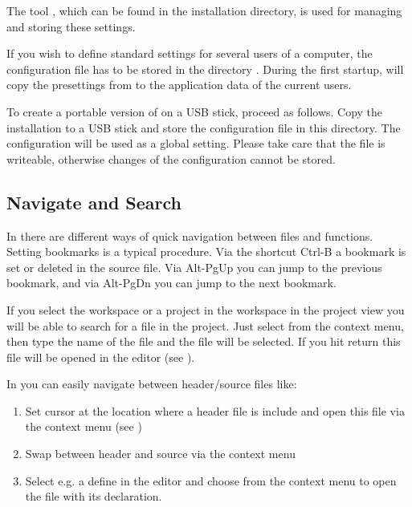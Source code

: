 The tool , which can be found in the \codeblocks installation directory, is used for managing and storing these settings.

If you wish to define standard settings for several users of a computer, the configuration file  has to be stored in the directory . During the first startup, \codeblocks will copy the presettings from  to the application data of the current users.

To create a portable version of \codeblocks on a USB stick, proceed as follows. Copy the \codeblocks installation to a USB stick and store the configuration file  in this directory. The configuration will be used as a global setting. Please take care that the file is writeable, otherwise changes of the configuration cannot be stored.

\subsection{Navigate and Search}

In \codeblocks there are different ways of quick navigation between files and functions. Setting bookmarks is a typical procedure. Via the shortcut Ctrl-B a bookmark is set or deleted in the source file. Via Alt-PgUp you can jump to the previous bookmark, and via Alt-PgDn you can jump to the next bookmark.

If you select the workspace or a project in the workspace in the project view you will be able to search for a file in the project. Just select  from the context menu, then type the name of the file and the file will be selected. If you hit return this file will be opened in the editor (see ).


In \codeblocks you can easily navigate between header/source files like:

\begin{enumerate}
\item Set cursor at the location where a header file is include and open this file via the context menu  (see )
\item Swap between header and source via the context menu 
\item Select e.g. a define in the editor and choose  from the context menu to open the file with its declaration.
\end{enumerate}

